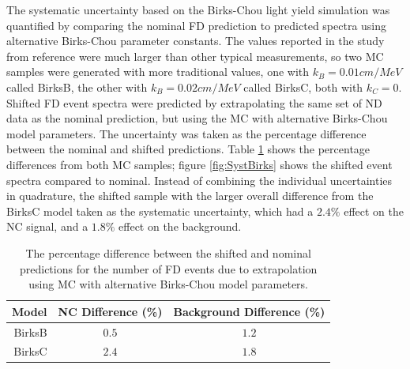 The systematic uncertainty based on the Birks-Chou light yield simulation was quantified by comparing the nominal FD prediction to predicted spectra using alternative Birks-Chou parameter constants. The values reported in the study from reference \cite{ref:DanBirks} were much larger than other typical measurements, so two MC samples were generated with more traditional values, one with $k_B = 0.01\unit{cm/MeV}$ called BirksB, the other with $k_B = 0.02\unit{cm/MeV}$ called BirksC, both with $k_C = 0$. Shifted FD event spectra were predicted by extrapolating the same set of ND data as the nominal prediction, but using the MC with alternative Birks-Chou model parameters. The uncertainty was taken as the percentage difference between the nominal and shifted predictions. Table \ref{tab:SystBirks} shows the percentage differences from both MC samples; figure \ref{fig:SystBirks} shows the shifted event spectra compared to nominal. Instead of combining the individual uncertainties in quadrature, the shifted sample with the larger overall difference from the BirksC model taken as the systematic uncertainty, which had a $2.4\%$ effect on the NC signal, and a $1.8\%$ effect on the background.
\begin{table}[htb]
  \begin{center}
    \begin{tabular}{r c c}
      \hline\hline
      Model & NC Difference (\%) & Background Difference (\%) \\
      \hline
      BirksB & $0.5$ & $1.2$ \\
      BirksC & $2.4$ & $1.8$ \\
      \hline
    \end{tabular}
    \caption[Birks-Chou Systematic Uncertainties]{The percentage difference between the shifted and nominal predictions for the number of FD events due to extrapolation using MC with alternative Birks-Chou model parameters.}
    \label{tab:SystBirks}
  \end{center}
\end{table}

